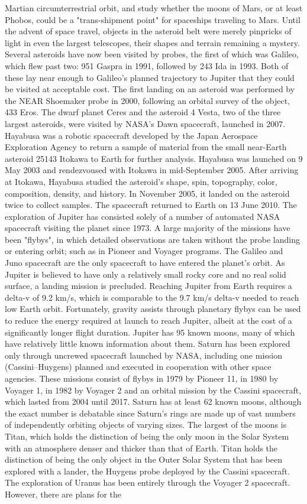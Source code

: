 \documentclass[12pt]{article}
\begin{document}
Martian circumterrestrial orbit, and study whether the moons of Mars, or at least Phobos, could be a "trans-shipment point" for spaceships traveling to Mars. Until the advent of space travel, objects in the asteroid belt were merely pinpricks of light in even the largest telescopes, their shapes and terrain remaining a mystery. Several asteroids have now been visited by probes, the first of which was Galileo, which flew past two: 951 Gaspra in 1991, followed by 243 Ida in 1993. Both of these lay near enough to Galileo's planned trajectory to Jupiter that they could be visited at acceptable cost. The first landing on an asteroid was performed by the NEAR Shoemaker probe in 2000, following an orbital survey of the object, 433 Eros. The dwarf planet Ceres and the asteroid 4 Vesta, two of the three largest asteroids, were visited by NASA's Dawn spacecraft, launched in 2007. Hayabusa was a robotic spacecraft developed by the Japan Aerospace Exploration Agency to return a sample of material from the small near-Earth asteroid 25143 Itokawa to Earth for further analysis. Hayabusa was launched on 9 May 2003 and rendezvoused with Itokawa in mid-September 2005. After arriving at Itokawa, Hayabusa studied the asteroid's shape, spin, topography, color, composition, density, and history. In November 2005, it landed on the asteroid twice to collect samples. The spacecraft returned to Earth on 13 June 2010. The exploration of Jupiter has consisted solely of a number of automated NASA spacecraft visiting the planet since 1973. A large majority of the missions have been "flybys", in which detailed observations are taken without the probe landing or entering orbit; such as in Pioneer and Voyager programs. The Galileo and Juno spacecraft are the only spacecraft to have entered the planet's orbit. As Jupiter is believed to have only a relatively small rocky core and no real solid surface, a landing mission is precluded. Reaching Jupiter from Earth requires a delta-v of 9.2 km/s, which is comparable to the 9.7 km/s delta-v needed to reach low Earth orbit. Fortunately, gravity assists through planetary flybys can be used to reduce the energy required at launch to reach Jupiter, albeit at the cost of a significantly longer flight duration. Jupiter has 95 known moons, many of which have relatively little known information about them. Saturn has been explored only through uncrewed spacecraft launched by NASA, including one mission (Cassini–Huygens) planned and executed in cooperation with other space agencies. These missions consist of flybys in 1979 by Pioneer 11, in 1980 by Voyager 1, in 1982 by Voyager 2 and an orbital mission by the Cassini spacecraft, which lasted from 2004 until 2017. Saturn has at least 62 known moons, although the exact number is debatable since Saturn's rings are made up of vast numbers of independently orbiting objects of varying sizes. The largest of the moons is Titan, which holds the distinction of being the only moon in the Solar System with an atmosphere denser and thicker than that of Earth. Titan holds the distinction of being the only object in the Outer Solar System that has been explored with a lander, the Huygens probe deployed by the Cassini spacecraft. The exploration of Uranus has been entirely through the Voyager 2 spacecraft. However, there are plans for the 
\end{document}
